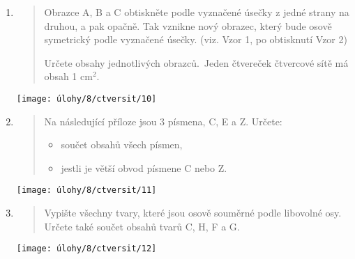 \begin{enumerate}
\begin{minipage}[t]{\linewidth}
    \end{minipage}

    \item
    \begin{minipage}[t]{\linewidth}
        \begin{quote}
            Obrazce A, B a C obtiskněte podle vyznačené úsečky z jedné strany na druhou, a pak opačně.
            Tak vznikne nový obrazec, který bude osově symetrický podle vyznačené úsečky.
            (viz.
            Vzor 1, po obtisknutí Vzor 2)

            Určete obsahy jednotlivých obrazců.\             Jeden čtvereček čtvercové sítě má obsah 1 cm$^{2}$.
        \end{quote}
        \centering
        \texttt{[image: úlohy/8/ctversit/10]}

    \end{minipage}

    \item
    \begin{minipage}[t]{\linewidth}
        \begin{quote}
            Na následující příloze jsou 3 písmena, C, E a Z. Určete:
            \begin{itemize}
                \item součet obsahů všech písmen,
                \item jestli je větší obvod písmene C nebo Z\@.
            \end{itemize}
        \end{quote}
        \centering
        \texttt{[image: úlohy/8/ctversit/11]}

    \end{minipage}

    \item
    \begin{minipage}[t]{\linewidth}
        \begin{quote}
            Vypište všechny tvary, které jsou osově souměrné podle libovolné osy.
            Určete také součet obsahů tvarů C, H, F a G\@.
        \end{quote}
        \centering
        \texttt{[image: úlohy/8/ctversit/12]}

    \end{minipage}
\end{enumerate}

\newpage

